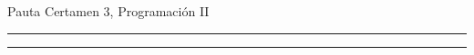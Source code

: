 \documentclass[10pt]{article}
\begin{document}
\begin{center}
    {\Large Pauta Certamen 3, Programaci\'on II} \\
\end{center}
\vspace*{-35pt}
\begin{center}
    \rule{1\textwidth}{.3pt}
\end{center}
\vspace*{-42pt}
\begin{center}
    \rule{1\textwidth}{2pt}
\end{center}

%
\end{document}
